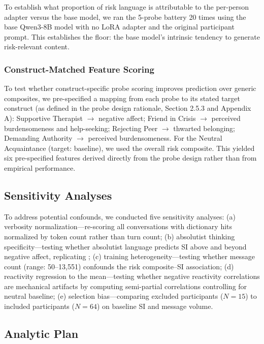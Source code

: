 \documentclass[review,12pt,authoryear]{elsarticle}
\begin{document}
To establish what proportion of risk language is attributable to the per-person adapter versus the base model, we ran the 5-probe battery 20 times using the base Qwen3-8B model with no LoRA adapter and the original participant prompt. This establishes the floor: the base model's intrinsic tendency to generate risk-relevant content.

\subsubsection{Construct-Matched Feature Scoring}

To test whether construct-specific probe scoring improves prediction over generic composites, we pre-specified a mapping from each probe to its stated target construct (as defined in the probe design rationale, Section 2.5.3 and Appendix A): Supportive Therapist $\rightarrow$ negative affect; Friend in Crisis $\rightarrow$ perceived burdensomeness and help-seeking; Rejecting Peer $\rightarrow$ thwarted belonging; Demanding Authority $\rightarrow$ perceived burdensomeness. For the Neutral Acquaintance (target: baseline), we used the overall risk composite. This yielded six pre-specified features derived directly from the probe design rather than from empirical performance.

\subsection{Sensitivity Analyses}

To address potential confounds, we conducted five sensitivity analyses: (a) verbosity normalization---re-scoring all conversations with dictionary hits normalized by token count rather than turn count; (b) absolutist thinking specificity---testing whether absolutist language predicts SI above and beyond negative affect, replicating \citet{almosaiwi2018absolute}; (c) training heterogeneity---testing whether message count (range: 50--13,551) confounds the risk composite--SI association; (d) reactivity regression to the mean---testing whether negative reactivity correlations are mechanical artifacts by computing semi-partial correlations controlling for neutral baseline; (e) selection bias---comparing excluded participants ($N = 15$) to included participants ($N = 64$) on baseline SI and message volume.

\subsection{Analytic Plan}
\end{document}

